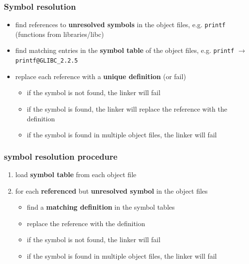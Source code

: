 \documentclass[letterpaper,12pt]{article}
\begin{document}
\subsubsection{Symbol resolution}
\begin{itemize}
    \item find references to \textbf{unresolved symbols} in the object files, e.g. \texttt{printf} (functions from libraries/libc)
    \item find matching entries in the \textbf{symbol table} of the object files, e.g. \texttt{printf} $\to$ \texttt{printf@GLIBC\_2.2.5}
    \item replace each reference with a \textbf{unique definition} (or fail) \begin{itemize}
        \item if the symbol is not found, the linker will fail
        \item if the symbol is found, the linker will replace the reference with the definition
        \item if the symbol is found in multiple object files, the linker will fail
    \end{itemize}
\end{itemize}
\subsubsection{symbol resolution procedure}
\begin{enumerate}
    \item load \textbf{symbol table} from each object file
    \item for each \textbf{referenced} but \textbf{unresolved symbol} in the object files\begin{itemize}
        \item find a \textbf{matching definition} in the symbol tables
        \item replace the reference with the definition
        \item if the symbol is not found, the linker will fail
        \item if the symbol is found in multiple object files, the linker will fail
    \end{itemize}
\end{enumerate}
\end{document}
